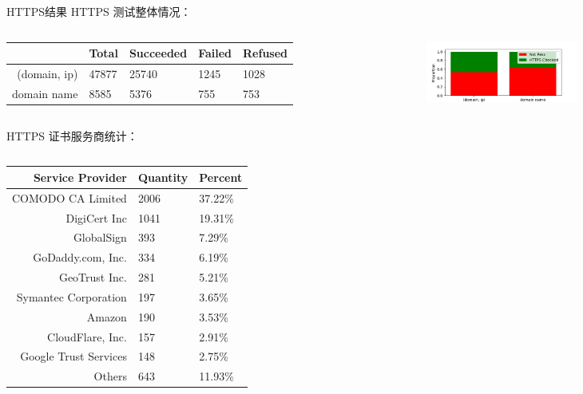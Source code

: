 \documentclass{beamer}
\begin{document}
  \begin{frame}{HTTPS结果}
    HTTPS 测试整体情况：
    \begin{columns}
      \begin{column}{0.5\textwidth}
        \begin{table}
          \tiny
        \begin{tabular}{r|l|l|l|l}
          \toprule
                  & Total & Succeeded & Failed &  Refused \\
          \midrule
          (domain, ip) & 47877& 25740 & 1245 &1028\\
          domain name&   8585&5376& 755 &753\\
          \bottomrule
          \end{tabular}
        \end{table}

      \end{column}
      \begin{column}{0.5\textwidth}
        \begin{figure}
          \includegraphics[height=2cm]{images/figure/figure_httpscheck.png}
          \end{figure}
      \end{column}
      \end{columns}
HTTPS 证书服务商统计：
\begin{columns}
      
  \begin{column}{0.5\textwidth}
    \begin{table}
      \tiny
    \begin{tabular}{r|l|l}
      \toprule
      Service Provider &Quantity & Percent\\
      \midrule
      COMODO CA Limited&2006 & 37.22\%\\
      DigiCert Inc&1041& 19.31\%\\
      GlobalSign &393& 7.29\%\\
      GoDaddy.com, Inc.&334& 6.19\%\\
      GeoTrust Inc.&281& 5.21\%\\
      Symantec Corporation&197& 3.65\%\\
      Amazon&190& 3.53\%\\
      CloudFlare, Inc.&157& 2.91\%\\
      Google Trust Services&148& 2.75\%\\
      Others & 643& 11.93\%\\
      \bottomrule
      \end{tabular}
    \end{table}


\end{column}
\end{columns}
\end{frame}
\end{document}
